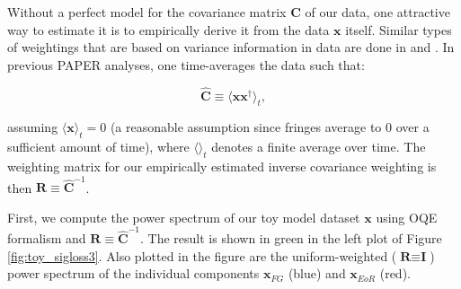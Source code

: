 \documentclass[preprint2,numberedappendix,tighten]{aastex6}  %
\begin{document}
Without a perfect model for the covariance matrix $\textbf{C}$ of our data, one attractive way to estimate it is to empirically derive it from the data $\textbf{x}$ itself. Similar types of weightings that are based on variance information in data are done in \citet{chang_et_al2010} and \citet{switzer_et_al2015}. In previous PAPER analyses, one time-averages the data such that:

\begin{equation}
\widehat{\textbf{C}} \equiv \langle\textbf{xx}^{\dagger}\rangle_{t},
\end{equation}

\noindent assuming $\langle\textbf{x}\rangle_{t} = 0$ (a reasonable assumption since fringes average to $0$ over a sufficient 
amount of time), where $\langle \rangle_{t}$ denotes a finite average over time. The weighting matrix for our empirically estimated inverse covariance weighting is then $
\textbf{R} \equiv \widehat{\textbf{C}}^{-1}$.

First, we compute the power spectrum of our toy model dataset $\textbf{x}$ using OQE formalism and $\textbf{R} \equiv \widehat{\textbf{C}}^{-1}$. 
The result is shown in green in the left plot of Figure \ref{fig:toy_sigloss3}. Also plotted in the figure are the uniform-weighted ($\textbf{R} \equiv \textbf{I}$) power spectrum of the individual components $
\textbf{x}_{FG}$ (blue) and $\textbf{x}_{EoR}$ (red). 
\end{document}
